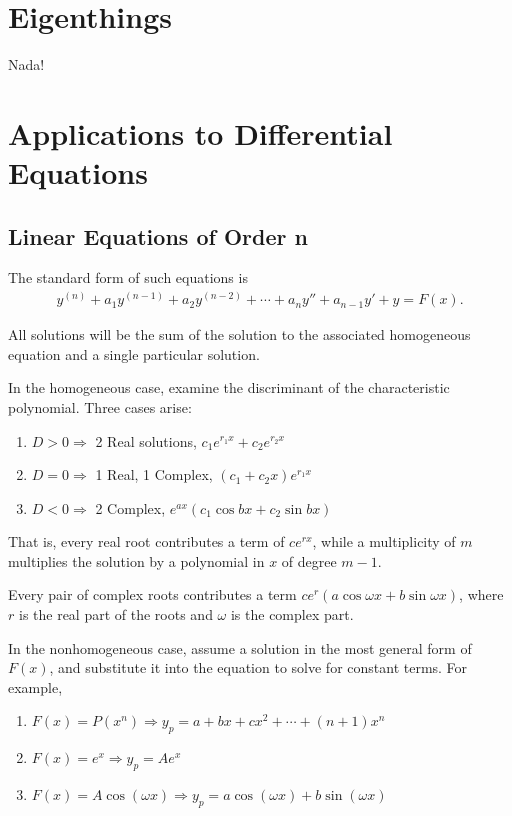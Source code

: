 \documentclass[a4paper,10pt]{report}
\begin{document}
\chapter{Eigenthings}
Nada!

\chapter{Applications to Differential Equations}
\section{Linear Equations of Order n}
The standard form of such equations is
\begin{align*}
	y^{(n)} + a_1y^{(n-1)} + a_2y^{(n-2)} + \cdots +a_ny'' + a_{n-1}y' + y = F(x).
\end{align*}

All solutions will be the sum of the solution to the associated homogeneous equation and a single particular solution.

In the homogeneous case, examine the discriminant of the characteristic polynomial. Three cases arise:
\begin{enumerate}
	\item $D>0 \Rightarrow$ 2 Real solutions, $c_1e^{r_1x} + c_2e^{r_2x}$
	\item $D=0 \Rightarrow$ 1 Real, 1 Complex, $(c_1 +c_2x)e^{r_1x}$
	\item $D<0 \Rightarrow$ 2 Complex, $e^{ax}(c_1\cos bx + c_2\sin bx)$
\end{enumerate}
That is, every real root contributes a term of $ce^{rx}$, while a multiplicity of $m$ multiplies the solution by a polynomial in $x$ of degree $m-1$.

Every pair of complex roots contributes a term $ce^r(a\cos \omega x + b\sin \omega x)$, where $r$ is the real part of the roots and $\omega$ is the complex part.

In the nonhomogeneous case, assume a solution in the most general form of $F(x)$, and substitute it into the equation to solve for constant terms. For example,
\begin{enumerate}
	\item $F(x) = P(x^n) \Rightarrow y_p = a+bx+cx^2+\cdots+(n+1)x^n$
	\item $F(x) = e^x \Rightarrow y_p = Ae^x$
	\item $F(x) = A\cos (\omega x) \Rightarrow y_p = a\cos(\omega x) + b\sin(\omega x)$
\end{enumerate}
\end{document}
